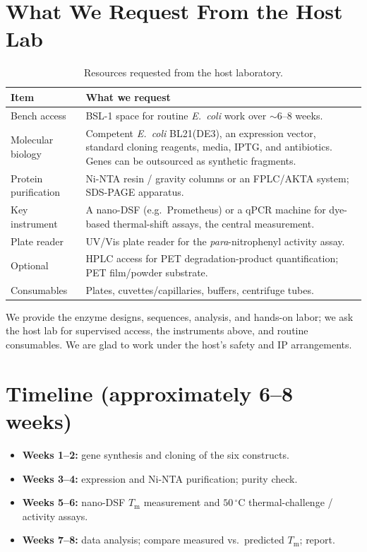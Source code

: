 \documentclass[11pt]{article}
\begin{document}
\section{What We Request From the Host Lab}
\begin{table}[ht]
\centering
\caption{Resources requested from the host laboratory.}
\label{tab:resources}
\begin{tabular}{@{}l p{}@{}}
\toprule
Item & What we request \\
\midrule
Bench access & BSL-1 space for routine \emph{E.\ coli} work over $\sim$6--8 weeks. \\
\addlinespace
Molecular biology & Competent \emph{E.\ coli} BL21(DE3), an expression vector, standard cloning
reagents, media, IPTG, and antibiotics. Genes can be outsourced as synthetic fragments. \\
\addlinespace
Protein purification & Ni-NTA resin / gravity columns or an FPLC/AKTA system; SDS-PAGE apparatus. \\
\addlinespace
Key instrument & A nano-DSF (e.g.\ Prometheus) or a qPCR machine for dye-based thermal-shift
assays, the central measurement. \\
\addlinespace
Plate reader & UV/Vis plate reader for the \emph{para}-nitrophenyl activity assay. \\
\addlinespace
Optional & HPLC access for PET degradation-product quantification; PET film/powder substrate. \\
\addlinespace
Consumables & Plates, cuvettes/capillaries, buffers, centrifuge tubes. \\
\bottomrule
\end{tabular}
\end{table}
We provide the enzyme designs, sequences, analysis, and hands-on labor; we ask the host lab for
supervised access, the instruments above, and routine consumables. We are glad to work under
the host's safety and IP arrangements.

\section{Timeline (approximately 6--8 weeks)}
\begin{itemize}
\item \textbf{Weeks 1--2:} gene synthesis and cloning of the six constructs.
\item \textbf{Weeks 3--4:} expression and Ni-NTA purification; purity check.
\item \textbf{Weeks 5--6:} nano-DSF $T_\mathrm{m}$ measurement and $50\,^{\circ}$C
thermal-challenge / activity assays.
\item \textbf{Weeks 7--8:} data analysis; compare measured vs.\ predicted $T_\mathrm{m}$; report.
\end{itemize}
\end{document}
